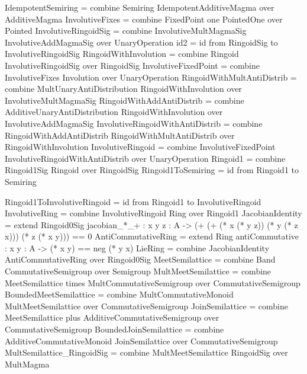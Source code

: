 \begin{togcode} 
IdempotentSemiring = 
  combine Semiring {} IdempotentAdditiveMagma {} over AdditiveMagma
InvolutiveFixes = combine FixedPoint one PointedOne {} over Pointed
InvolutiveRingoidSig = 
  combine InvolutiveMultMagmaSig {} InvolutiveAddMagmaSig {} 
  over UnaryOperation
id2 = id from RingoidSig to InvolutiveRingoidSig 
RingoidWithInvolution = 
  combine Ringoid {} InvolutiveRingoidSig {} over RingoidSig 
InvolutiveFixedPoint = 
  combine InvolutiveFixes {} Involution {} over UnaryOperation 
RingoidWithMultAntiDistrib = 
  combine MultUnaryAntiDistribution {} RingoidWithInvolution {} 
  over InvolutiveMultMagmaSig 
RingoidWithAddAntiDistrib = 
  combine AdditiveUnaryAntiDistribution {} RingoidWithInvolution {} 
  over InvolutiveAddMagmaSig  
InvolutiveRingoidWithAntiDistrib = 
  combine RingoidWithAddAntiDistrib {} RingoidWithMultAntiDistrib {} 
  over RingoidWithInvolution
InvolutiveRingoid = 
  combine InvolutiveFixedPoint {} InvolutiveRingoidWithAntiDistrib {} 
  over UnaryOperation 
Ringoid1 = combine Ringoid1Sig {} Ringoid {} over RingoidSig
Ringoid1ToSemiring = id from Ringoid1 to Semiring
\end{togcode} 

\begin{togcode} 
Ringoid1ToInvolutiveRingoid = id from Ringoid1 to InvolutiveRingoid
InvolutiveRing = combine InvolutiveRingoid {} Ring {} over Ringoid1 
JacobianIdentity = extend Ringoid0Sig 
     {jacobian_*_+ : {x y z : A} -> 
          (+ (+ (* x (* y z)) (* y (* z x))) (* z (* x y))) == 0}
AntiCommutativeRing = 
  extend Ring {antiCommutative : {x y : A} -> (* x y) == neg (* y x)} 
LieRing = 
  combine JacobianIdentity {} AntiCommutativeRing {} over Ringoid0Sig 
MeetSemilattice = combine Band {} CommutativeSemigroup {} over Semigroup
MultMeetSemilattice = 
  combine MeetSemilattice times MultCommutativeSemigroup {} 
  over CommutativeSemigroup
BoundedMeetSemilattice = 
  combine MultCommutativeMonoid {} MultMeetSemilattice {} 
  over CommutativeSemigroup
JoinSemilattice = 
  combine MeetSemilattice plus AdditiveCommutativeSemigroup {} 
  over CommutativeSemigroup
BoundedJoinSemilattice = 
  combine AdditiveCommutativeMonoid {} JoinSemilattice {} 
  over CommutativeSemigroup
MultSemilattice_RingoidSig = 
  combine MultMeetSemilattice {} RingoidSig {} over MultMagma
\end{togcode}

